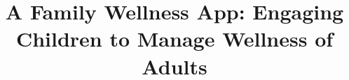 \documentclass{sig-alternate}
\begin{document}
\setlength{\parindent}{0pt}
%

\title{A Family Wellness App: Engaging Children to Manage Wellness of Adults}
%
%
%
%
%
\end{document}

